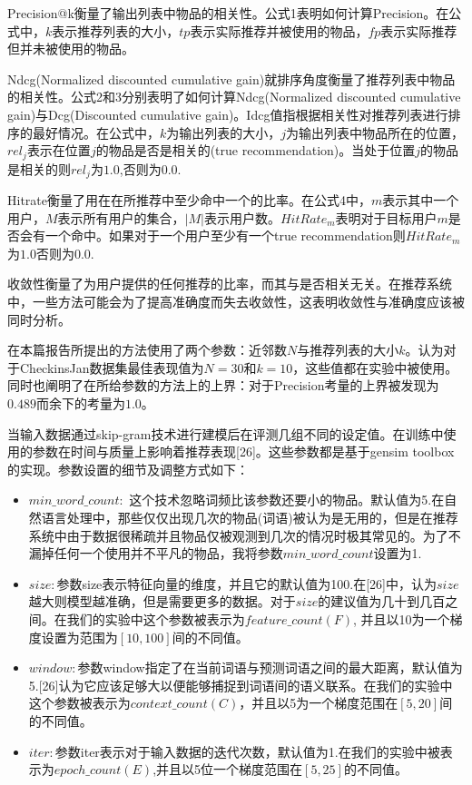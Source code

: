 \documentclass[UTF8]{ctexart}
\begin{document}
	Precision@k衡量了输出列表中物品的相关性。公式1表明如何计算Precision。在公式中，$k$表示推荐列表的大小，$tp$表示实际推荐并被使用的物品，$fp$表示实际推荐但并未被使用的物品。
	
	Ndcg(Normalized discounted cumulative gain)就排序角度衡量了推荐列表中物品的相关性。公式2和3分别表明了如何计算Ndcg(Normalized discounted cumulative gain)与Dcg(Discounted cumulative gain)。Idcg值指根据相关性对推荐列表进行排序的最好情况。在公式中，$k$为输出列表的大小，$j$为输出列表中物品所在的位置，$rel_j$表示在位置$j$的物品是否是相关的(true recommendation)。当处于位置$j$的物品是相关的则$rel_j$为$1.0$,否则为$0.0$.
	
	Hitrate衡量了用在在所推荐中至少命中一个的比率。在公式4中，$m$表示其中一个用户，$M$表示所有用户的集合，$|M|$表示用户数。$HitRate_m$表明对于目标用户$m$是否会有一个命中。如果对于一个用户至少有一个true recommendation则$HitRate_m$为$1.0$否则为$0.0$.
	
	收敛性衡量了为用户提供的任何推荐的比率，而其与是否相关无关。在推荐系统中，一些方法可能会为了提高准确度而失去收敛性\cite{bellogin2013empirical,herlocker2004evaluating}，这表明收敛性与准确度应该被同时分析。
	
	在本篇报告所提出的方法使用了两个参数：近邻数$N$与推荐列表的大小$k$。\cite{ozsoy2014multi}认为对于CheckinsJan数据集最佳表现值为$N=30$和$k=10$，这些值都在实验中被使用。同时\cite{ozsoy2014multi}也阐明了在所给参数的方法上的上界：对于Precision考量的上界被发现为$0.489$而余下的考量为$1.0$。
	
	当输入数据通过skip-gram技术进行建模后在评测几组不同的设定值。在训练中使用的参数在时间与质量上影响着推荐表现[26]。这些参数都是基于gensim toolbox的实现。参数设置的细节及调整方式如下：
	\begin{itemize}
		\item $min\_ word \_count:$ 这个技术忽略词频比该参数还要小的物品。默认值为5.在自然语言处理中，那些仅仅出现几次的物品(词语)被认为是无用的，但是在推荐系统中由于数据很稀疏并且物品仅被观测到几次的情况时极其常见的。为了不漏掉任何一个使用并不平凡的物品，我将参数$min\_word\_count$设置为1.
		\item $size:$参数size表示特征向量的维度，并且它的默认值为100.在[26]中，认为$size$越大则模型越准确，但是需要更多的数据。对于$size$的建议值为几十到几百之间。在我们的实验中这个参数被表示为$feature\_count\left(F\right)$, 并且以10为一个梯度设置为范围为$[10,100]$间的不同值。
		\item $window:$参数window指定了在当前词语与预测词语之间的最大距离，默认值为5.[26]认为它应该足够大以便能够捕捉到词语间的语义联系。在我们的实验中这个参数被表示为$context\_count\left(C\right)$，并且以5为一个梯度范围在$\left[5,20\right]$间的不同值。
		\item $iter:$参数iter表示对于输入数据的迭代次数，默认值为1.在我们的实验中被表示为$epoch\_count\left(E\right)$,并且以5位一个梯度范围在$\left[5,25\right]$的不同值。
	\end{itemize}
	
\end{document}
